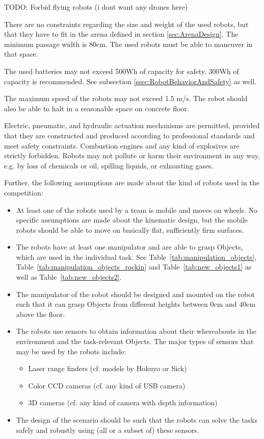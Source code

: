 TODO: Forbid flying robots (i dont want any drones here)

There are no constraints regarding the size and weight of the used robots, but that they have to fit in the arena defined in section \ref{sec:ArenaDesign}. The minimum passage width is $80\si{\centi\meter}$. The used robots must be able to maneuver in that space.\par

The used batteries may not exceed 500Wh of capacity for safety. 300Wh of capacity is recommended. See subsection \ref{ssec:RobotBehaviorAndSafety} as well.\par 

The maximum speed of the robots may not exceed 1.5 m/s. The robot should also be able to halt in a reasonable space on concrete floor.

\par
Electric, pneumatic, and hydraulic actuation mechanisms are permitted, provided that they are constructed and produced according to professional standards and meet safety constraints. Combustion engines and any kind of explosives are strictly forbidden. Robots may not pollute or harm their environment in any way, e.g. by loss of chemicals or oil, spilling liquids, or exhausting gases.
\par
Further, the following assumptions are made about the kind of robots used in the competition:
\par
\begin{itemize}
	\item At least one of the robots used by a team is mobile and moves on wheels. No specific assumptions are made about the kinematic design, but the mobile robots should be able to move on basically flat, sufficiently firm surfaces.
	\item The robots have at least one manipulator and are able to grasp Objects, which are used in the individual task. See Table~\ref{tab:manipulation_objects}, Table~\ref{tab:manipulation_objects_rockin} and Table~\ref{tab:new_objects1} as well as Table~\ref{tab:new_objects2}.
	\item The manipulator of the robot should be designed and mounted on the robot such that it can grasp Objects from different heights between $0\si{\centi\meter}$ and $40\si{\centi\meter}$ above the floor.
	\item The robots use sensors to obtain information about their whereabouts in the environment and the task-relevant Objects. The major types of sensors that may be used by the robots include:
	\begin{itemize}
		\item Laser range finders (cf. models by Hokuyo or Sick)
		\item Color CCD cameras (cf. any kind of USB camera)
		\item 3D cameras (cf. any kind of camera with depth information)
	\end{itemize}
	\item The design of the scenario should be such that the robots can solve the tasks safely and robustly using (all or a subset of) these sensors.
\end{itemize}

